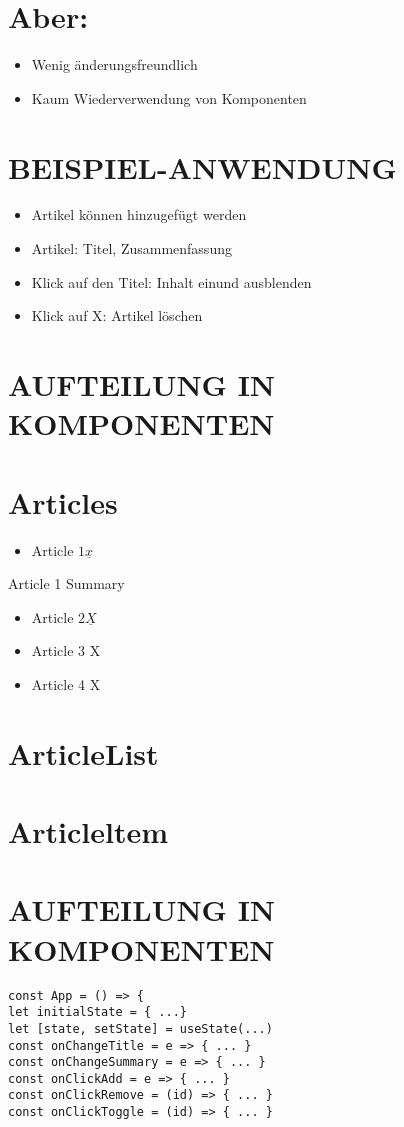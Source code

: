 \section*{Aber:}
\begin{itemize}
  \item Wenig änderungsfreundlich
  \item Kaum Wiederverwendung von Komponenten
\end{itemize}

\section*{BEISPIEL-ANWENDUNG}


\begin{itemize}
  \item Artikel können hinzugefügt werden
  \item Artikel: Titel, Zusammenfassung
  \item Klick auf den Titel: Inhalt einund ausblenden
  \item Klick auf X: Artikel löschen
\end{itemize}

\section*{AUFTEILUNG IN KOMPONENTEN}
\section*{Articles}
\begin{itemize}
  \item Article $1 \underline{x}$
\end{itemize}

Article 1 Summary

\begin{itemize}
  \item Article $2 \underline{X}$
  \item Article 3 X
  \item Article 4 X
\end{itemize}

\section*{ArticleList}
\section*{Articleltem}
\section*{AUFTEILUNG IN KOMPONENTEN}
\begin{verbatim}
const App = () => {
let initialState = { ...}
let [state, setState] = useState(...)
const onChangeTitle = e => { ... }
const onChangeSummary = e => { ... }
const onClickAdd = e => { ... }
const onClickRemove = (id) => { ... }
const onClickToggle = (id) => { ... }
\end{verbatim}

